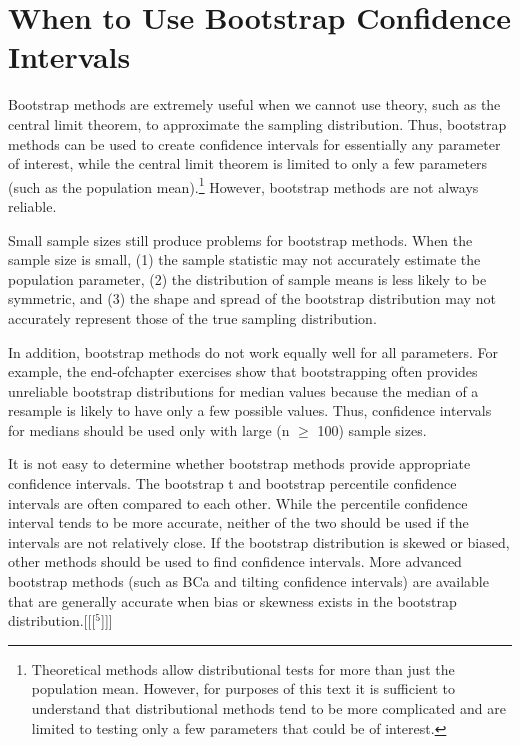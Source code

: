 \documentclass[
]{report}
\begin{document}
\hypertarget{when-to-use-bootstrap-confidence-intervals}{%
\section*{When to Use Bootstrap Confidence Intervals}\label{when-to-use-bootstrap-confidence-intervals}}

Bootstrap methods are extremely useful when we cannot use theory, such as the central limit theorem, to approximate the sampling distribution. Thus, bootstrap methods can be used to create confidence intervals for essentially any parameter of interest, while the central limit theorem is limited to only a few parameters
(such as the population mean).\footnote{Theoretical methods allow distributional tests for more than just the population mean. However, for purposes of this text it is sufficient to understand that distributional methods tend to be more complicated and are limited to testing only a few parameters that could be of interest.} However, bootstrap methods are not always reliable.

Small sample sizes still produce problems for bootstrap methods. When the sample size is small, (1) the sample statistic may not accurately estimate the population parameter, (2) the distribution of sample means is less likely to be symmetric, and (3) the shape and spread of the bootstrap distribution may not accurately represent those of the true sampling distribution.

In addition, bootstrap methods do not work equally well for all parameters. For example, the end-ofchapter exercises show that bootstrapping often provides unreliable bootstrap distributions for median values because the median of a resample is likely to have only a few possible values. Thus, confidence intervals for medians should be used only with large (n \(\geq\) 100) sample sizes.

It is not easy to determine whether bootstrap methods provide appropriate confidence intervals. The bootstrap t and bootstrap percentile confidence intervals are often compared to each other. While the percentile confidence interval tends to be more accurate, neither of the two should be used if the intervals are not relatively
close. If the bootstrap distribution is skewed or biased, other methods should be used to find confidence intervals. More advanced bootstrap methods (such as BCa and tilting confidence intervals) are available that are generally accurate when bias or skewness exists in the bootstrap distribution.{[}{[}{[}\(^5\){]}{]}{]}
\end{document}
